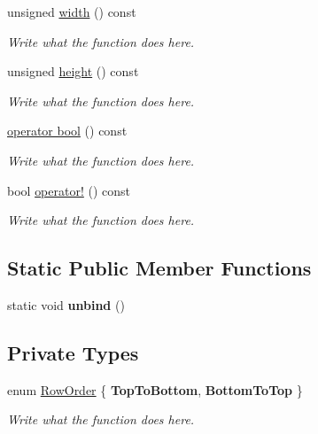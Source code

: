 \begin{DoxyCompactItemize}
\item 
unsigned \hyperlink{classImage_a4010d0e12a669145acd733bcf9f4bfc5}{width} () const 
\begin{DoxyCompactList}\small\item\em Write what the function does here. \end{DoxyCompactList}\item 
unsigned \hyperlink{classImage_ad37da5a6118258cf72b0f1dc4d947309}{height} () const 
\begin{DoxyCompactList}\small\item\em Write what the function does here. \end{DoxyCompactList}\item 
\hyperlink{classImage_a265f35ac9a54a1162f0b1bbf4a4a6d5d}{operator bool} () const 
\begin{DoxyCompactList}\small\item\em Write what the function does here. \end{DoxyCompactList}\item 
bool \hyperlink{classImage_a287b62a3f46e2e5836182c8d99815721}{operator!} () const 
\begin{DoxyCompactList}\small\item\em Write what the function does here. \end{DoxyCompactList}\end{DoxyCompactItemize}
\subsection*{Static Public Member Functions}
\begin{DoxyCompactItemize}
\item 
\hypertarget{classImage_a60aa59d14aedd4047f034326b347c7c8}{static void {\bfseries unbind} ()}\label{classImage_a60aa59d14aedd4047f034326b347c7c8}

\end{DoxyCompactItemize}
\subsection*{Private Types}
\begin{DoxyCompactItemize}
\item 
enum \hyperlink{classImage_a856d0983e089ff127d0bcad3828c1aab}{Row\+Order} \{ {\bfseries Top\+To\+Bottom}, 
{\bfseries Bottom\+To\+Top}
 \}
\begin{DoxyCompactList}\small\item\em Write what the function does here. \end{DoxyCompactList}\end{DoxyCompactItemize}
